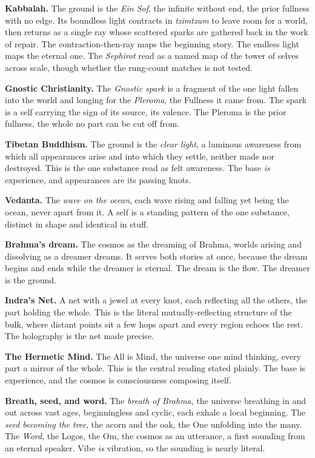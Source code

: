 \textbf{Kabbalah.} The ground is the \emph{Ein Sof}, the infinite without end, the prior fullness with no edge. Its boundless light contracts in \emph{tzimtzum} to leave room for a world, then returns as a single ray whose scattered sparks are gathered back in the work of repair. The contraction-then-ray maps the beginning story. The endless light maps the eternal one. The \emph{Sephirot} read as a named map of the tower of selves across scale, though whether the rung-count matches is not tested.

\textbf{Gnostic Christianity.} The \emph{Gnostic spark} is a fragment of the one light fallen into the world and longing for the \emph{Pleroma}, the Fullness it came from. The spark is a self carrying the sign of its source, its valence. The Pleroma is the prior fullness, the whole no part can be cut off from.

\textbf{Tibetan Buddhism.} The ground is the \emph{clear light}, a luminous awareness from which all appearances arise and into which they settle, neither made nor destroyed. This is the one substance read as felt awareness. The base \emph{is} experience, and appearances are its passing knots.

\textbf{Vedanta.} The \emph{wave on the ocean}, each wave rising and falling yet being the ocean, never apart from it. A self is a standing pattern of the one substance, distinct in shape and identical in stuff.

\textbf{Brahma's dream.} The cosmos as the dreaming of Brahma, worlds arising and dissolving as a dreamer dreams. It serves both stories at once, because the dream begins and ends while the dreamer is eternal. The dream is the flow. The dreamer is the ground.

\textbf{Indra's Net.} A net with a jewel at every knot, each reflecting all the others, the part holding the whole. This is the literal mutually-reflecting structure of the bulk, where distant points sit a few hops apart and every region echoes the rest. The holography is the net made precise.

\textbf{The Hermetic Mind.} The All is Mind, the universe one mind thinking, every part a mirror of the whole. This is the central reading stated plainly. The base is experience, and the cosmos is consciousness composing itself.

\textbf{Breath, seed, and word.} The \emph{breath of Brahma}, the universe breathing in and out across vast ages, beginningless and cyclic, each exhale a local beginning. The \emph{seed becoming the tree}, the acorn and the oak, the One unfolding into the many. The \emph{Word}, the Logos, the Om, the cosmos as an utterance, a first sounding from an eternal speaker. Vibe \emph{is} vibration, so the sounding is nearly literal.


